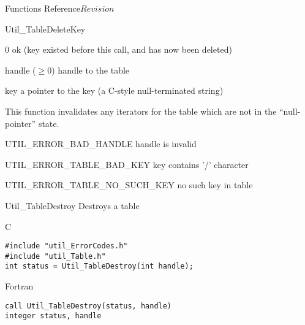 \begin{cactuspart}{ Functions Reference}{}{$Revision$}
\begin{FunctionDescription}{Util\_TableDeleteKey}
\begin{ResultSection}
\begin{Result}{\rm 0}
ok (key existed before this call, and has now been deleted)
\end{Result}
\end{ResultSection}

\begin{ParameterSection}
\begin{Parameter}{handle ($\ge 0$)}
handle to the table
\end{Parameter}
\begin{Parameter}{key}
a pointer to the key (a C-style null-terminated string)
\end{Parameter}
\end{ParameterSection}

\begin{Discussion}
This function invalidates any iterators for the table which are
not in the ``null-pointer'' state.
\end{Discussion}

\begin{ErrorSection}
\begin{Error}{UTIL\_ERROR\_BAD\_HANDLE}
handle is invalid
\end{Error}
\begin{Error}{UTIL\_ERROR\_TABLE\_BAD\_KEY}
key contains '/' character
\end{Error}
\begin{Error}{UTIL\_ERROR\_TABLE\_NO\_SUCH\_KEY}
no such key in table
\end{Error}
\end{ErrorSection}
\end{FunctionDescription}


\begin{FunctionDescription}{Util\_TableDestroy}
\label{Util-TableDestroy}
Destroys a table

\begin{SynopsisSection}
\begin{Synopsis}{C}
\begin{verbatim}
#include "util_ErrorCodes.h"
#include "util_Table.h"
int status = Util_TableDestroy(int handle);
\end{verbatim}
\end{Synopsis}
\begin{Synopsis}{Fortran}
\begin{verbatim}
call Util_TableDestroy(status, handle)
integer status, handle
\end{verbatim}
\end{Synopsis}
\end{SynopsisSection}


\end{FunctionDescription}
\end{cactuspart}
